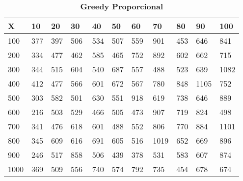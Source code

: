 \documentclass[10pt,letterpaper]{article}
\begin{document}
\begin{center}
\begin{table}\renewcommand{\arraystretch}{2.5}
\caption{\large \textbf{Greedy Proporcional}}
\centering
\begin{tabular} { |m{0.5cm}|m{1.3cm}|m{1.3cm}|m{1.3cm}|m{1.3cm}|m{1.3cm}|m{1.3cm}|m{1.3cm}|m{1.3cm}|m{1.3cm}|m{1.3cm}|} 
\hline
\rowcolor{Gray}
\centering \textbf{X} & \centering \textbf{10} & \centering \textbf{20} & \centering \textbf{30}\ & \centering \textbf{40} & \centering \textbf{50} & \centering \textbf{60}\ & \centering \textbf{70} & \centering \textbf{80} & \centering \textbf{90}\ & \textbf{100} \\\hline
\cellcolor{Gray}100 & \Large 377 & \Large 397 & \Large 506 & \Large 534 & \Large 507 & \Large 559 & \Large 901 & \Large 453 & \Large 646 & \Large 841 \\
\hline
\cellcolor{Gray}200 & \Large 334 & \Large 477 & \Large 462 & \Large 585 & \Large 465 & \Large 752 & \Large 892 & \Large 602 & \Large 662 & \Large 715 \\
\hline
\cellcolor{Gray}300 & \Large 344 & \Large 515 & \Large 604 & \Large 540 & \Large 687 & \Large 557 & \Large 488 & \Large 523 & \Large 639 & \Large 1082 \\
\hline
\cellcolor{Gray}400 & \Large 412 & \Large 477 & \Large 566 & \Large 601 & \Large 672 & \Large 567 & \Large 780 & \Large 848 & \Large 1105 & \Large 752 \\
\hline
\cellcolor{Gray}500 & \Large 303 & \Large 582 & \Large 501 & \Large 630 & \Large 551 & \Large 918 & \Large 619 & \Large 738 & \Large 646 & \Large 889 \\
\hline
\cellcolor{Gray}600 & \Large 216 & \Large 503 & \Large 529 & \Large 466 & \Large 505 & \Large 473 & \Large 907 & \Large 719 & \Large 824 & \Large 498 \\
\hline
\cellcolor{Gray}700 & \Large 341 & \Large 476 & \Large 618 & \Large 601 & \Large 488 & \Large 552 & \Large 806 & \Large 770 & \Large 884 & \Large 1101 \\
\hline
\cellcolor{Gray}800 & \Large 345 & \Large 609 & \Large 616 & \Large 691 & \Large 605 & \Large 516 & \Large 1019 & \Large 652 & \Large 669 & \Large 896 \\
\hline
\cellcolor{Gray}900 & \Large 246 & \Large 517 & \Large 858 & \Large 506 & \Large 439 & \Large 378 & \Large 531 & \Large 583 & \Large 607 & \Large 874 \\
\hline
\cellcolor{Gray}1000 & \Large 369 & \Large 509 & \Large 556 & \Large 740 & \Large 574 & \Large 792 & \Large 735 & \Large 454 & \Large 678 & \Large 674 \\
\hline
\end{tabular} \\
\end{table}
\end{center}
\end{document}
